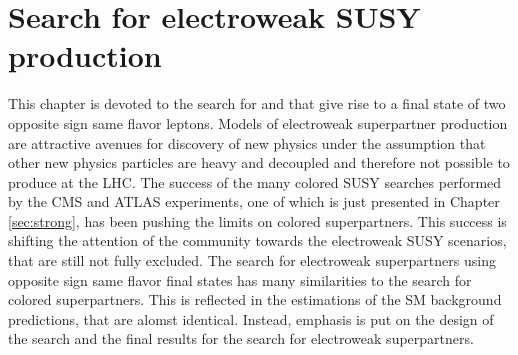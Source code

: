 \chapter{Search for electroweak SUSY\\ production}\label{sec:ewk}
\noindent
\justify
This chapter is devoted to the search for \firstcharg\PSGczDt and \PSGczDo\PSGczDo that give rise to a final state of two opposite sign same flavor leptons. 
Models of electroweak superpartner production are attractive avenues for discovery of new physics under the assumption that other new physics particles are heavy and decoupled and therefore not possible to produce at the LHC.  
The success of the many colored SUSY searches performed by the CMS and ATLAS experiments, one of which is just presented in Chapter \ref{sec:strong}, has been pushing the limits on colored superpartners. 
This success is shifting the attention of the community towards the electroweak SUSY scenarios, that are still not fully excluded. 
The search for electroweak superpartners using opposite sign same flavor final states has many similarities to the search for colored superpartners. 
This is reflected in the estimations of the SM background predictions, that are alomst identical. 
Instead, emphasis is put on the design of the search and the final results for the search for electroweak superpartners.
\newpage
